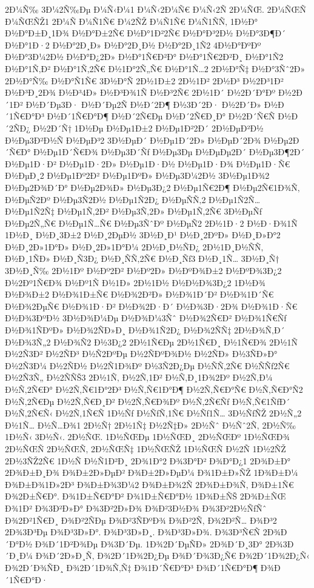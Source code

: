 {2Ð¼Ñ‰
3Ð¼2Ñ‰Ðµ
Ð¼Ñ‹Ð¼1
Ð¼Ñ‹2Ð¼Ñ€
Ð¼Ñ‹2Ñ
2Ð¼ÑŒ.
2Ð¼ÑŒÑ
Ð¼ÑŒÑŽ1
2Ð¼Ñ
Ð¼Ñ1Ñ€
Ð¼2ÑŽ
Ð¼Ñ1Ñ€
Ð¼Ñ1ÑÑ‚
1Ð½Ð°
Ð½Ð°Ð±Ð¸1Ð¾
Ð½Ð°Ð±2Ñ€
Ð½Ð°1Ð²2Ñ€
Ð½Ð°Ð³2Ð½
Ð½Ð°3Ð¶Ð´
Ð½Ð°1Ð·2
Ð½Ð°2Ð¸Ð»
Ð½Ð°2Ð¸Ð½
Ð½Ð°2Ð¸1Ñ2
4Ð½Ð°ÐºÐº
Ð½Ð°3Ð¼2Ð½
Ð½Ð°Ð¿2Ð»
Ð½Ð°1Ñ€Ð²Ð°
Ð½Ð°1Ñ€2Ð²Ð¸
Ð½Ð°1Ñ2
Ð½Ð°1Ñ‚Ð²
Ð½Ð°1Ñ‚2Ñ€
Ð½1Ð°2Ñ„Ñ€
Ð½Ð°1Ñ…2
2Ð½Ð°Ñ‡
Ð½Ð°3Ñˆ2Ð»
2Ð½Ð°Ñ‰
Ð½Ð°Ñ1Ñ€
3Ð½Ð°Ñ
2Ð½1Ð±2
2Ð½1Ð²
2Ð½Ð³
Ð½2Ð³1Ð²
Ð½Ð³Ð¸2Ð¾
Ð½Ð³4Ð»
Ð½Ð³Ð¾1Ñ
Ð½Ð³2Ñ€
2Ð½1Ð´
Ð½2Ð´Ð°Ðº
Ð½2Ð´1Ð²
Ð½Ð´Ðµ3Ð·
Ð½Ð´Ðµ2Ñ
Ð½Ð´2Ð¶
Ð½3Ð´2Ð·
Ð½2Ð´Ð»
Ð½Ð´1Ñ€Ð°Ð³
Ð½Ð´1Ñ€Ð°Ð¶
Ð½Ð´2Ñ€Ðµ
Ð½Ð´2Ñ€Ð¸Ð°
Ð½2Ð´Ñ€Ñ
Ð½Ð´2ÑÐ¿
Ð½2Ð´Ñ†
1Ð½Ðµ
Ð½Ðµ1Ð±2
Ð½Ðµ1Ð²2Ð´
2Ð½ÐµÐ²Ð½
Ð½Ðµ3Ð²Ð½Ñ
Ð½ÐµÐ³2
3Ð½ÐµÐ´
Ð½Ðµ1Ð´2Ð»
Ð½ÐµÐ´2Ð¾
Ð½Ðµ2Ð´Ñ€Ð°
Ð½Ðµ1Ð´Ñ€Ð¾
Ð½Ðµ3Ð´Ñƒ
Ð½Ðµ3Ðµ
Ð½ÐµÐµ2Ð´
Ð½Ðµ3Ð¶2Ð´
Ð½Ðµ1Ð·Ð²
Ð½Ðµ1Ð·2Ð»
Ð½Ðµ1Ð·Ð½
Ð½Ðµ1Ð·Ð¾
Ð½Ðµ1Ð·Ñ€
Ð½ÐµÐ¸2
Ð½Ðµ1Ðº2Ð²
Ð½Ðµ1ÐºÐ»
Ð½Ðµ3Ð¼2Ð½
3Ð½Ðµ1Ð¾2
Ð½Ðµ2Ð¾Ð´Ð°
Ð½Ðµ2Ð¾Ð»
Ð½Ðµ3Ð¿2
Ð½Ðµ1Ñ€2Ð¶
Ð½Ðµ2Ñ€1Ð¾Ñ‚
Ð½ÐµÑ2Ðº
Ð½Ðµ3Ñ2Ð½
Ð½Ðµ1Ñ2Ð¿
Ð½ÐµÑÑ‚2
Ð½Ðµ1Ñ2Ñ…
Ð½Ðµ1Ñ2Ñ‡
Ð½Ðµ1Ñ‚2Ð²
Ð½Ðµ3Ñ‚2Ð»
Ð½Ðµ1Ñ‚2Ñ€
3Ð½ÐµÑƒ
Ð½Ðµ2Ñ„Ñ€
Ð½Ðµ1Ñ…Ñ€
Ð½Ðµ3ÑˆÐº
Ð½ÐµÑ2
2Ð½1Ð·2
Ð½Ð·Ð¾1Ñ
1Ð½Ð¸
Ð½Ð¸3Ð±2
Ð½Ð¸2ÐµÐ½
3Ð½Ð¸Ð¹
Ð½Ð¸2ÐºÐ»
Ð½Ð¸Ð»Ð°2
Ð½Ð¸2Ð»1Ð°Ð»
Ð½Ð¸2Ð»1Ð°Ð¼
2Ð½Ð¸Ð½ÑÐ¿
2Ð½1Ð¸Ð½ÑÑ‚
Ð½Ð¸1ÑÐ»
Ð½Ð¸Ñ3Ð¿
Ð½Ð¸ÑÑ‚2Ñ€
Ð½Ð¸Ñƒ3
Ð½Ð¸1Ñ…
3Ð½Ð¸Ñ†
3Ð½Ð¸Ñ‰
2Ð½1Ðº
Ð½Ðº2Ð²
Ð½Ðº2Ð»
Ð½ÐºÐ¾Ð±2
Ð½ÐºÐ¾3Ð¿2
Ð½2Ðº1Ñ€Ð¾
Ð½Ðº1Ñ
Ð½1Ð»
2Ð½1Ð½
Ð½Ð½Ð¾3Ð¿2
1Ð½Ð¾
Ð½Ð¾Ð±2
Ð½Ð¾1Ð±Ñ€
Ð½Ð¾2Ð²Ð»
Ð½Ð¾1Ð´Ð²
Ð½Ð¾1Ð´Ñ€
Ð½Ð¾2ÐµÑ€
Ð½Ð¾1Ð·Ð²
Ð½Ð¾2Ð·Ð´
Ð½Ð¾3Ð·2Ð¾
Ð½Ð¾1Ð·Ñ€
Ð½Ð¾3ÐºÐ½
3Ð½Ð¾Ð¼Ðµ
Ð½Ð¾Ð¼3Ñˆ
Ð½Ð¾2Ñ€Ð²
Ð½Ð¾1Ñ€Ñƒ
Ð½Ð¾1ÑÐºÐ»
Ð½Ð¾2ÑÐ»Ð¸
Ð½Ð¾1Ñ2Ð¿
Ð½Ð¾2ÑÑ‡
2Ð½Ð¾Ñ‚Ð´
Ð½Ð¾3Ñ„2
Ð½Ð¾Ñ2
Ð½3Ð¿2
2Ð½1Ñ€Ðµ
2Ð½1Ñ€Ð¸
Ð½1Ñ€Ð¾
2Ð½1Ñ
Ð½2Ñ3Ð²
Ð½2ÑÐ³
Ð½Ñ2ÐºÐµ
Ð½2ÑÐºÐ¾Ð½
Ð½2ÑÐ»
Ð½3ÑÐ»Ð°
Ð½2Ñ3Ð¼
Ð½2ÑÐ½
Ð½2Ñ1Ð¾Ðº
Ð½3Ñ2Ð¿Ðµ
Ð½ÑÑ‚2Ñ€
Ð½ÑÑƒ2Ñ€
Ð½2Ñ3Ñ„
Ð½2ÑÑŠ3
2Ð½1Ñ‚
Ð½2Ñ‚1Ð²
Ð½Ñ‚Ð¸1Ð¾2Ðº
Ð½2Ñ‚Ð¼
Ð½Ñ‚2Ñ€Ð°
Ð½2Ñ‚Ñ€1Ð°2Ð³
Ð½Ñ‚Ñ€1Ð°Ð¶
Ð½2Ñ‚Ñ€Ð°Ñ€
Ð½Ñ‚Ñ€Ð°Ñ2
Ð½Ñ‚2Ñ€Ðµ
Ð½2Ñ‚Ñ€Ð¸Ð²
Ð½2Ñ‚Ñ€Ð¾Ðº
Ð½Ñ‚2Ñ€Ñƒ
Ð½Ñ‚Ñ€1ÑƒÐ´
Ð½Ñ‚2Ñ€Ñ‹
Ð½2Ñ‚1Ñ€Ñ
1Ð½Ñƒ
Ð½ÑƒÑ‚1Ñ€
Ð½Ñƒ1Ñ…
3Ð½ÑƒÑŽ
2Ð½Ñ„2
Ð½1Ñ…
Ð½Ñ…Ð¾1
2Ð½Ñ†
2Ð½1Ñ‡
Ð½2Ñ‡Ð»
2Ð½Ñˆ
Ð½Ñˆ2Ñ‚
2Ð½Ñ‰
1Ð½Ñ‹
3Ð½Ñ‹.
2Ð½ÑŒ.
1Ð½ÑŒÐµ
1Ð½ÑŒÐ¸
2Ð½ÑŒÐº
1Ð½ÑŒÐ¾
2Ð½ÑŒÑ
2Ð½ÑŒÑ‚
2Ð½ÑŒÑ‡
1Ð½ÑŒÑŽ
1Ð½ÑŒÑ
Ð½2Ñ
1Ð½2ÑŽ
2Ð½3ÑŽ2Ñ€
1Ð½Ñ
Ð½Ñ1Ð²Ð¸
2Ð¾1Ð°2
Ð¾3Ð°Ð²
Ð¾Ð°Ð¿1
2Ð¾Ð±Ð°
2Ð¾Ð±Ð¸Ð¾
Ð¾Ð±2Ð»ÐµÐ²
Ð¾Ð±2Ð»ÐµÐ¼
Ð¾1Ð±Ð»ÑŽ
1Ð¾Ð±Ð¼
Ð¾Ð±Ð¾1Ð»2Ð³
Ð¾Ð±Ð¾3Ð¼2
Ð¾Ð±Ð¾2Ñ
2Ð¾Ð±Ð¾Ñ‚
Ð¾Ð±1Ñ€
Ð¾2Ð±Ñ€Ð°.
Ð¾1Ð±Ñ€Ð°Ð²
Ð¾1Ð±Ñ€Ð°Ð½
1Ð¾Ð±ÑŠ
2Ð¾Ð±ÑŒ
Ð¾1Ð²
Ð¾3Ð²Ð»Ð°
Ð¾3Ð²2Ð»Ð¾
Ð¾Ð²3Ð½Ð¾
Ð¾3Ð²2Ð½ÑƒÑˆ
Ð¾2Ð²1Ñ€Ð¸
Ð¾Ð²2ÑÐµ
Ð¾Ð²3ÑÐºÐ¾
Ð¾Ð²2Ñ‚
Ð¾2Ð²Ñ…
Ð¾Ð³2
2Ð¾3Ð³Ðµ
Ð¾Ð³3Ð»Ð°.
Ð¾Ð³3Ð»Ð¸.
Ð¾Ð³3Ð»Ð¾.
Ð¾3Ð³Ñ€Ñ
2Ð¾Ð´Ð°Ð½
Ð¾Ð´1Ð²Ð¾Ðµ
Ð¾3Ð´Ðµ.
1Ð¾2Ð´ÐµÑÐ»
2Ð¾Ð´Ð¸3Ð°
2Ð¾3Ð´Ð¸Ð¼
Ð¾Ð´2Ð»Ð¸Ñ‚
Ð¾2Ð´1Ð¾2Ð¿Ðµ
Ð¾Ð´Ð¾3Ð¿Ñ€
Ð¾2Ð´1Ð¾2Ð¿Ñ‹
Ð¾2Ð´Ð¾ÑÐ¸
Ð¾2Ð´1Ð¾Ñ‚Ñ‡
Ð¾1Ð´Ñ€Ð°Ð³
Ð¾Ð´1Ñ€Ð°Ð¶
Ð¾Ð´1Ñ€Ð°Ð·
}
